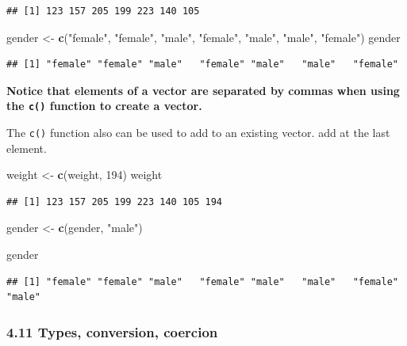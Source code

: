 \documentclass[]{article}
\newenvironment{Shaded}{\begin{snugshade}}{\end{snugshade}}
\newcommand{\KeywordTok}[1]{\textcolor[rgb]{0.13,0.29,0.53}{\textbf{#1}}}
\newcommand{\DecValTok}[1]{\textcolor[rgb]{0.00,0.00,0.81}{#1}}
\newcommand{\StringTok}[1]{\textcolor[rgb]{0.31,0.60,0.02}{#1}}
\newcommand{\NormalTok}[1]{#1}
\begin{document}
\begin{verbatim}
## [1] 123 157 205 199 223 140 105
\end{verbatim}

\begin{Shaded}
\begin{Highlighting}[]
\NormalTok{gender <-}\StringTok{ }\KeywordTok{c}\NormalTok{(}\StringTok{"female"}\NormalTok{, }\StringTok{"female"}\NormalTok{, }\StringTok{"male"}\NormalTok{, }\StringTok{"female"}\NormalTok{, }\StringTok{"male"}\NormalTok{, }\StringTok{"male"}\NormalTok{, }\StringTok{"female"}\NormalTok{)}
\NormalTok{gender}
\end{Highlighting}
\end{Shaded}

\begin{verbatim}
## [1] "female" "female" "male"   "female" "male"   "male"   "female"
\end{verbatim}

\textbf{Notice that elements of a vector are separated by commas when
using the \texttt{c()} function to create a vector.}

The \texttt{c()} function also can be used to add to an existing vector.
add at the last element.

\begin{Shaded}
\begin{Highlighting}[]
\NormalTok{weight <-}\StringTok{ }\KeywordTok{c}\NormalTok{(weight, }\DecValTok{194}\NormalTok{)}
\NormalTok{weight}
\end{Highlighting}
\end{Shaded}

\begin{verbatim}
## [1] 123 157 205 199 223 140 105 194
\end{verbatim}

\begin{Shaded}
\begin{Highlighting}[]
\NormalTok{gender <-}\StringTok{ }\KeywordTok{c}\NormalTok{(gender, }\StringTok{"male"}\NormalTok{)}

\NormalTok{gender}
\end{Highlighting}
\end{Shaded}

\begin{verbatim}
## [1] "female" "female" "male"   "female" "male"   "male"   "female" "male"
\end{verbatim}

\subsubsection{4.11 Types, conversion,
coercion}\label{types-conversion-coercion}
\end{document}
